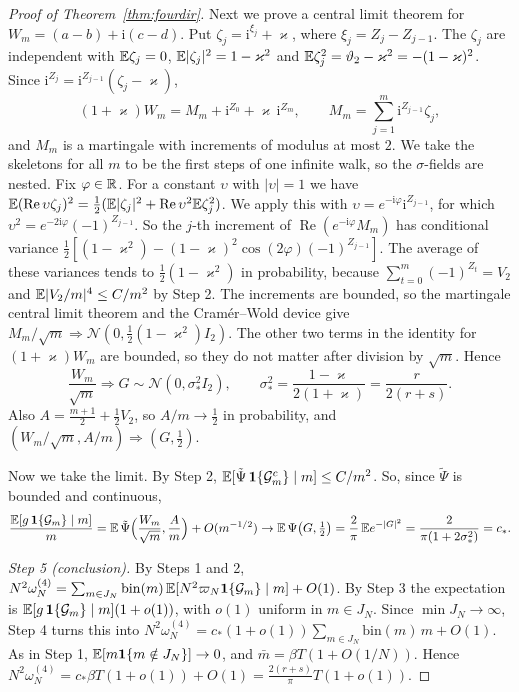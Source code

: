 \begin{proof}[Proof of Theorem~\ref{thm:fourdir}]
Next we prove a central limit theorem for $W_m=(a-b)+\mathrm i(c-d)$. Put
$\zeta_j=\mathrm i^{\xi_j}+\varkappa$, where $\xi_j=Z_j-Z_{j-1}$. The $\zeta_j$ are independent with
$\mathbb{E}\zeta_j=0$, $\mathbb{E}\lvert\zeta_j\rvert^2=1-\varkappa^2$ and
$\mathbb{E}\zeta_j^2=\vartheta_2-\varkappa^2=-(1-\varkappa)^2$. Since
$\mathrm i^{Z_j}=\mathrm i^{Z_{j-1}}(\zeta_j-\varkappa)$,
\[
 (1+\varkappa)W_m=M_m+\mathrm i^{Z_0}+\varkappa\,\mathrm i^{Z_m},\qquad
 M_m=\sum_{j=1}^m\mathrm i^{Z_{j-1}}\zeta_j,
\]
and $M_m$ is a martingale with increments of modulus at most $2$. We take the skeletons for all $m$
to be the first steps of one infinite walk, so the $\sigma$-fields are nested. Fix $\varphi\in\mathbb{R}$. For a
constant $\upsilon$ with $\lvert\upsilon\rvert=1$ we have
$\mathbb{E}(\operatorname{Re}\upsilon\zeta_j)^2=\frac12(\mathbb{E}\lvert\zeta_j\rvert^2+\operatorname{Re}\upsilon^2\mathbb{E}\zeta_j^2)$.
We apply this with $\upsilon=e^{-\mathrm i\varphi}\mathrm i^{Z_{j-1}}$, for which
$\upsilon^2=e^{-2\mathrm i\varphi}(-1)^{Z_{j-1}}$.
So the $j$-th increment of $\operatorname{Re}(e^{-\mathrm i\varphi}M_m)$ has conditional variance
$\frac12[(1-\varkappa^2)-(1-\varkappa)^2\cos(2\varphi)(-1)^{Z_{j-1}}]$. The average of these
variances tends to $\frac12(1-\varkappa^2)$ in probability, because
$\sum_{t=0}^m(-1)^{Z_t}=V_2$ and $\mathbb{E}\lvert V_2/m\rvert^4\le C/m^2$ by Step 2. The increments are
bounded, so the martingale central limit theorem \cite[Cor.~3.1]{hallheyde1980} and the
Cram\'er--Wold device give $M_m/\sqrt m\Rightarrow\mathcal N(0,\frac12(1-\varkappa^2)I_2)$. The other two terms in the identity for
$(1+\varkappa)W_m$ are bounded, so they do not matter after division by $\sqrt m$. Hence
\[
 \frac{W_m}{\sqrt m}\Rightarrow G\sim\mathcal N(0,\sigma_*^2I_2),\qquad
 \sigma_*^2=\frac{1-\varkappa}{2(1+\varkappa)}=\frac r{2(r+s)}.
\]
Also $A=\frac{m+1}2+\frac12V_2$, so $A/m\to\frac12$ in probability, and
$(W_m/\sqrt m,A/m)\Rightarrow(G,\frac12)$.

Now we take the limit. By Step 2,
$\mathbb{E}[\tilde\Psi\,\mathbf 1\{\mathcal G_m^c\}\mid m]\le C/m^2$. So, since $\tilde\Psi$ is bounded and
continuous,
\[
 \frac{\mathbb{E}[g\,\mathbf 1\{\mathcal G_m\}\mid m]}m
 =\mathbb{E}\,\tilde\Psi\Bigl(\frac{W_m}{\sqrt m},\frac Am\Bigr)+O(m^{-1/2})
 \to\mathbb{E}\,\Psi\bigl(G,\tfrac12\bigr)=\frac2\pi\,\mathbb{E} e^{-\lvert G\rvert^2}
 =\frac2{\pi(1+2\sigma_*^2)}=c_*.
\]

\emph{Step 5 (conclusion).} By Steps 1 and 2,
$N^2\omega^{(4)}_N=\sum_{m\in J_N}\mathrm{bin}(m)\,\mathbb{E}[N^2\varpi_N\mathbf 1\{\mathcal G_m\}\mid m]+O(1)$.
By Step 3 the expectation is $\mathbb{E}[g\,\mathbf 1\{\mathcal G_m\}\mid m](1+o(1))$, with $o(1)$ uniform in
$m\in J_N$. Since $\min J_N\to\infty$, Step 4 turns this into
$N^2\omega^{(4)}_N=c_*(1+o(1))\sum_{m\in J_N}\mathrm{bin}(m)\,m+O(1)$. As in Step 1,
$\mathbb{E}[m\mathbf 1\{m\notin J_N\}]\to0$, and $\bar m=\beta T(1+O(1/N))$. Hence
$N^2\omega^{(4)}_N=c_*\beta T(1+o(1))+O(1)=\frac{2(r+s)}\pi T(1+o(1))$.
\end{proof}

